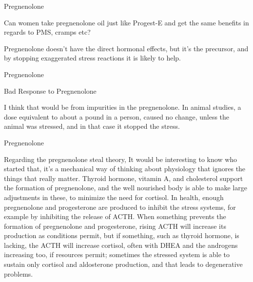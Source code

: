 \documentclass[11pt,oneside,openany,extrafontsizes]{memoir}
\begin{document}
\begin{qaexchange}{Pregnenolone}

    \begin{question}
        Can women take pregnenolone oil just like Progest-E and get the same benefits in regards to PMS, cramps etc?
    \end{question}

    \begin{answer}
        Pregnenolone doesn't have the direct hormonal effects, but it's the precursor, and by stopping exaggerated stress reactions it is likely to help.
    \end{answer}
\end{qaexchange}

\begin{standalonequote}{Pregnenolone}
    \begin{note}
        Bad Response to Pregnenolone
    \end{note}

    \begin{answer}
        I think that would be from impurities in the pregnenolone. In animal studies, a dose equivalent to about a pound in a person, caused no change, unless the animal was stressed, and in that case it stopped the stress.
    \end{answer}
\end{standalonequote}

\begin{standalonequote}{Pregnenolone}

    \begin{answer}
        Regarding the pregnenolone steal theory, It would be interesting to know who started that, it's a mechanical way of thinking about physiology that ignores the things that really matter. Thyroid hormone, vitamin A, and cholesterol support the formation of pregnenolone, and the well nourished body is able to make large adjustments in these, to minimize the need for cortisol. In health, enough pregnenolone and progesterone are produced to inhibit the stress systems, for example by inhibiting the release of ACTH. When something prevents the formation of pregnenolone and progesterone, rising ACTH will increase its production as conditions permit, but if something, such as thyroid hormone, is lacking, the ACTH will increase cortisol, often with DHEA and the androgens increasing too, if resources permit; sometimes the stressed system is able to sustain only cortisol and aldosterone production, and that leads to degenerative problems.
    \end{answer}
\end{standalonequote}
\end{document}
